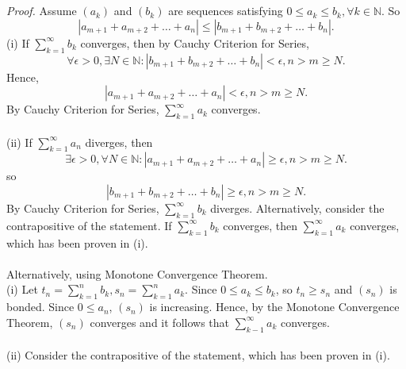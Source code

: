 \documentclass{article}
\begin{document}
            \\ \\
            \textit{Proof.} Assume $(a_k)$ and $(b_k)$ are sequences satisfying $0 \leq a_k \leq b_k,\forall k \in \mathbb{N}$. So
            \begin{equation*}
                |a_{m+1}+a_{m+2}+\dots+a_n| \leq |b_{m+1}+b_{m+2}+\dots+b_n|.
            \end{equation*}
            (i) If $\sum_{k=1}^\infty b_k$ converges, then by Cauchy Criterion for Series,
            \begin{equation*}
                \forall \epsilon > 0, \exists N \in \mathbb{N}: |b_{m+1}+b_{m+2}+\dots+b_n| < \epsilon,n>m \geq N.
            \end{equation*}
            Hence,
            \begin{equation*}
                |a_{m+1}+a_{m+2}+\dots+a_n| < \epsilon,n>m \geq N.
            \end{equation*}
            By Cauchy Criterion for Series, $\sum_{k=1}^\infty a_k$ converges.\\ \\
            (ii) If $\sum_{k=1}^\infty a_n$ diverges, then
            \begin{equation*}
                \exists \epsilon > 0, \forall N \in \mathbb{N}: |a_{m+1}+a_{m+2}+\dots+a_n| \geq \epsilon, n > m \geq N.
            \end{equation*}
            so 
            \begin{equation*}
                |b_{m+1}+b_{m+2}+\dots+b_n| \geq \epsilon, n > m \geq N.
            \end{equation*}
            By Cauchy Criterion for Series, $\sum_{k=1}^\infty b_k$ diverges. Alternatively, consider the contrapositive of the statement. If $\sum_{k=1}^\infty b_k$ converges, then $\sum_{k=1}^\infty a_k$ converges, which has been proven in (i). \\ \\
            Alternatively, using Monotone Convergence Theorem.\\
            (i) Let $t_n=\sum_{k=1}^n b_k,s_n=\sum_{k=1}^n a_k$. Since $0\leq a_k \leq b_k$, so $t_n \geq s_n$ and $(s_n)$ is bonded. Since $0\leq a_n$, $(s_n)$ is increasing. Hence, by the Monotone Convergence Theorem, $(s_n)$ converges and it follows that $\sum_{k-1}^\infty a_k$ converges.\\ \\
            (ii) Consider the contrapositive of the statement, which has been proven in (i).\\ \\
\end{document}
